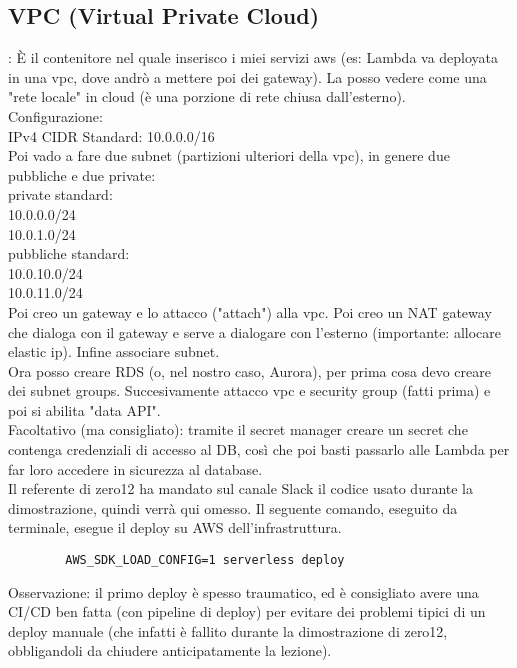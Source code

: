 \documentclass{classes/base}
\begin{document}
    \subsection*{VPC (Virtual Private Cloud)}:
    È il contenitore nel quale inserisco i miei servizi aws (es: Lambda va deployata in una vpc, dove andrò a mettere poi dei gateway).
    La posso vedere come una "rete locale" in cloud (è una porzione di rete chiusa dall'esterno).\\
    Configurazione:\\
    IPv4 CIDR Standard: 10.0.0.0/16 \\
    Poi vado a fare due subnet (partizioni ulteriori della vpc), in genere due pubbliche e due private:\\
    private standard:\\
    10.0.0.0/24\\
    10.0.1.0/24\\
    pubbliche standard:\\
    10.0.10.0/24\\
    10.0.11.0/24\\
    Poi creo un gateway e lo attacco ("attach") alla vpc. Poi creo un NAT gateway che dialoga con il gateway e serve a dialogare con l'esterno (importante: allocare elastic ip).
    Infine associare subnet. \\

    Ora posso creare RDS (o, nel nostro caso, Aurora), per prima cosa devo creare dei subnet groups.
    Succesivamente attacco vpc e security group (fatti prima) e poi si abilita "data API".\\

    Facoltativo (ma consigliato): tramite il secret manager creare un secret che contenga credenziali di accesso al DB, così che poi basti passarlo alle Lambda per far loro accedere in sicurezza al database.\\

    Il referente di zero12 ha mandato sul canale Slack il codice usato durante la dimostrazione, quindi verrà qui omesso. Il seguente comando, eseguito da terminale, esegue il deploy su AWS dell'infrastruttura.
    \begin{verbatim}
        AWS_SDK_LOAD_CONFIG=1 serverless deploy
    \end{verbatim}
    
    Osservazione: il primo deploy è spesso traumatico, ed è consigliato avere una CI/CD ben fatta (con pipeline di deploy) per evitare dei problemi tipici di un deploy manuale (che infatti è fallito durante la dimostrazione di zero12, obbligandoli da chiudere anticipatamente la lezione).
\end{document}
